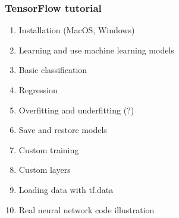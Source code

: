 \subsubsection{TensorFlow tutorial}
\begin{enumerate}
\item Installation (MacOS, Windows)
\item Learning and use machine learning models
\item Basic classification 
\item Regression 
\item Overfitting and underfitting (?)
\item Save and restore models
\item Custom training
\item Custom layers
\item Loading data with tf.data
\item Real neural network code illustration
\end{enumerate}




